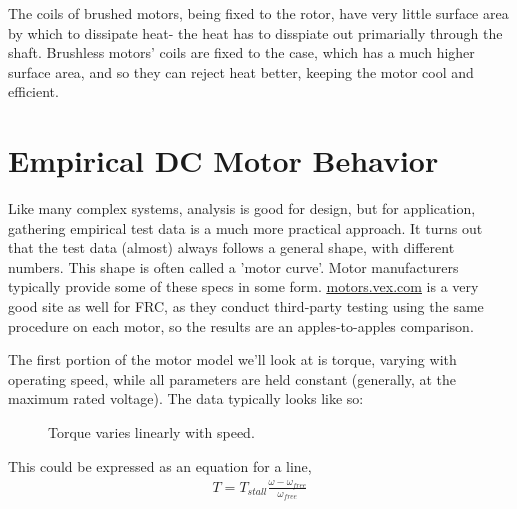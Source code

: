 \documentclass[10pt,letterpaper]{book}
\begin{document}
The coils of brushed motors, being fixed to the rotor, have very little surface area by which to dissipate heat- the heat has to disspiate out primarially through the shaft. Brushless motors' coils are fixed to the case, which has a much higher surface area, and so they can reject heat better, keeping the motor cool and efficient.

\newpage
\section{Empirical DC Motor Behavior}

Like many complex systems, analysis is good for design, but for application, gathering empirical test data is a much more practical approach. It turns out that the test data (almost) always follows a general shape, with different numbers. This shape is often called a 'motor curve'. Motor manufacturers typically provide some of these specs in some form. \href{http://motors.vex.com}{\color{red}\underline{motors.vex.com}} is a very good site as well for FRC, as they conduct third-party testing using the same procedure on each motor, so the results are an apples-to-apples comparison.


The first portion of the motor model we'll look at is torque, varying with operating speed, while all parameters are held constant (generally, at the maximum rated voltage). The data typically looks like so:

\begin{figure}[H] \centering \label{fig:motor_torque_curve}
\caption{Torque varies linearly with speed.}
\end{figure}

This could be expressed as an equation for a line,
\begin{align} \label{eq:motor_torque_curve}
  T = T_{stall} \frac{\omega-\omega_{free}}{\omega_{free}}
\end{align}
\end{document}
